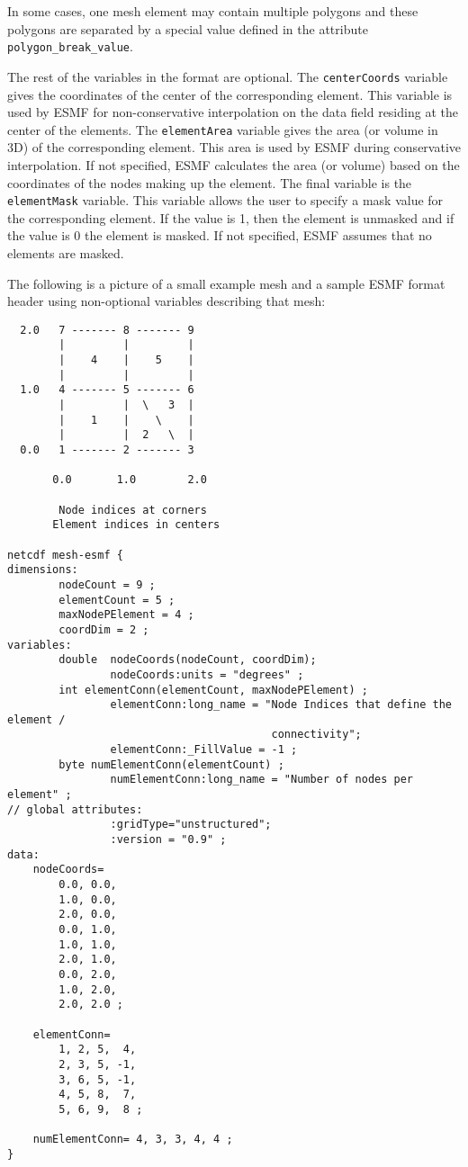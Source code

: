 In some cases, one mesh element may contain multiple polygons and these polygons are separated by a special value defined in the attribute
 {\tt polygon\_break\_value}. 
   
 The rest of the variables in the format are optional. The {\tt centerCoords} variable gives the coordinates of the center of the corresponding element.
 This variable is used by ESMF for non-conservative interpolation on the data field residing at the center of the elements.  The {\tt elementArea} variable gives the area (or volume in 3D) of the corresponding element. This
 area is used by ESMF during conservative interpolation. If not specified, ESMF calculates the area (or volume) based on the coordinates of the nodes
 making up the element. The final variable is the {\tt elementMask} variable. This variable allows the user to specify a mask value for
 the corresponding element. If the value is 1, then the element is unmasked and if the value is 0 the element is masked.
 If not specified, ESMF assumes that no elements are masked.

The following is a picture of a small example mesh and a sample ESMF format header using non-optional variables describing that mesh:

\begin{verbatim}
  2.0   7 ------- 8 ------- 9
        |         |         |
        |    4    |    5    |
        |         |         |
  1.0   4 ------- 5 ------- 6
        |         |  \   3  |
        |    1    |    \    |
        |         |  2   \  |
  0.0   1 ------- 2 ------- 3

       0.0       1.0        2.0

        Node indices at corners
       Element indices in centers

netcdf mesh-esmf {
dimensions:
        nodeCount = 9 ;
        elementCount = 5 ;
        maxNodePElement = 4 ;
        coordDim = 2 ;
variables:
        double  nodeCoords(nodeCount, coordDim);
                nodeCoords:units = "degrees" ;
        int elementConn(elementCount, maxNodePElement) ;
                elementConn:long_name = "Node Indices that define the element /
                                         connectivity";
                elementConn:_FillValue = -1 ;
        byte numElementConn(elementCount) ;
                numElementConn:long_name = "Number of nodes per element" ;
// global attributes:
                :gridType="unstructured";
                :version = "0.9" ;
data:
    nodeCoords=
        0.0, 0.0,
        1.0, 0.0,
        2.0, 0.0,
        0.0, 1.0,
        1.0, 1.0,
        2.0, 1.0,
        0.0, 2.0,
        1.0, 2.0,
        2.0, 2.0 ;

    elementConn=
        1, 2, 5,  4,
        2, 3, 5, -1,
        3, 6, 5, -1,
        4, 5, 8,  7,
        5, 6, 9,  8 ;

    numElementConn= 4, 3, 3, 4, 4 ;
}

\end{verbatim}

